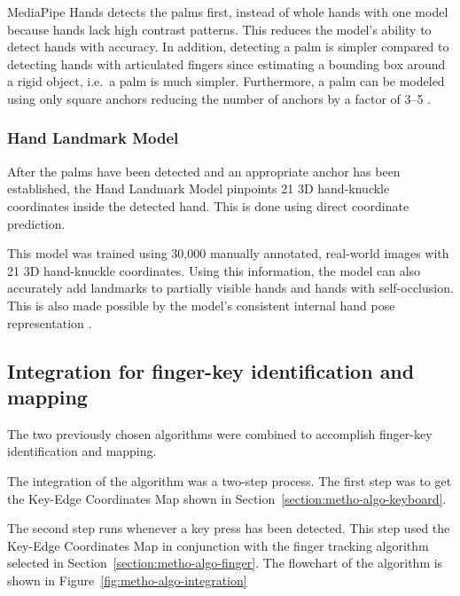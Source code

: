 \documentclass{report}
\begin{document}
MediaPipe Hands detects the palms first, instead of whole hands with one model
because hands lack high contrast patterns. This reduces the model's ability to
detect hands with accuracy. In addition, detecting a palm is simpler compared
to detecting hands with articulated fingers since estimating a bounding box
around a rigid object, i.e.\ a palm is much simpler. Furthermore, a palm can be
modeled using only square anchors reducing the number of anchors by a factor of
3--5 \parencite{mediapipe-hands}.

\subsubsection{Hand Landmark Model}
After the palms have been detected and an appropriate anchor has been
established, the Hand Landmark Model pinpoints 21 3D hand-knuckle coordinates
inside the detected hand. This is done using direct coordinate prediction.

This model was trained using 30,000 manually annotated, real-world images with
21 3D hand-knuckle coordinates. Using this information, the model can also
accurately add landmarks to partially visible hands and hands with
self-occlusion. This is also made possible by the model's consistent internal
hand pose representation \parencite{mediapipe-hands}.

\subsection{Integration for finger-key identification and mapping}

The two previously chosen algorithms were combined to accomplish finger-key
identification and mapping.

The integration of the algorithm was a two-step process. The first step was to
get the Key-Edge Coordinates Map shown in
Section~\ref{section:metho-algo-keyboard}.

The second step runs whenever a key press has been detected. This step used the
Key-Edge Coordinates Map in conjunction with the finger tracking algorithm selected
in Section~\ref{section:metho-algo-finger}. The flowchart of the algorithm is
shown in Figure~\ref{fig:metho-algo-integration}
\end{document}
